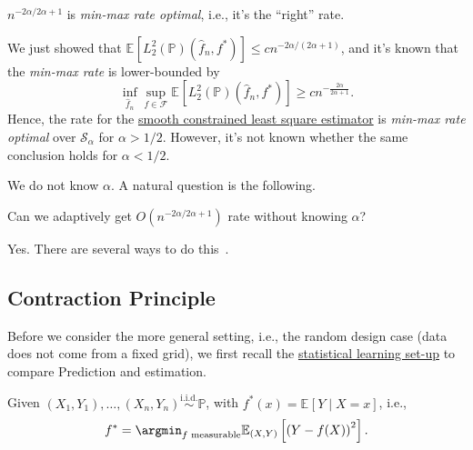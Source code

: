 \begin{remark}\label{rmk:min-max-rate-optimal}
	\(n^{-2\alpha / 2\alpha +1}\) is \emph{min-max rate optimal}, i.e., it's the ``right'' rate.
\end{remark}
\begin{explanation}
	We just showed that \(\mathbb{E}_{}[ L_2^2 (\mathbb{P} ) ( \hat{f} _n, f^{\ast} )] \leq c n^{-2\alpha / (2\alpha + 1)}\), and it's known that the \emph{min-max rate} is lower-bounded by
	\[
		\inf _{\hat{f} _n} \sup _{f \in \mathscr{F} } \mathbb{E}_{}\left[ L_2^2(\mathbb{P} ) (\hat{f} _n, f^{\ast} )\right] \geq c n^{-\frac{2\alpha}{2\alpha + 1}}.
	\]
	Hence, the rate for the \hyperref[prb:smooth-LS]{smooth constrained least square estimator} is \emph{min-max rate optimal} over \(\mathcal{S} _\alpha \) for \(\alpha > 1 / 2\). However, it's not known whether the same conclusion holds for \(\alpha < 1 / 2\).
\end{explanation}

We do not know \(\alpha \). A natural question is the following.

\begin{problem*}
	Can we adaptively get \(O(n^{-2\alpha / 2\alpha + 1})\) rate without knowing \(\alpha \)?
\end{problem*}
\begin{answer}
	Yes. There are several ways to do this~\cite{tsybakov2008introduction}.
\end{answer}

\subsection{Contraction Principle}
Before we consider the more general setting, i.e., the random design case (data does not come from a fixed grid), we first recall the \hyperref[sec:statistical-learning]{statistical learning set-up} to compare Prediction and estimation.

\begin{prev}
	Given \((X_1, Y_1), \dots , (X_n, Y_n) \overset{\text{i.i.d.} }{\sim } \mathbb{P} \), with \(f^{\ast} (x) = \mathbb{E}_{}\left[Y \mid X = x \right] \), i.e.,
	\[
		f^{\ast} = \argmin_{f \text{ measurable} } \mathbb{E}_{(X, Y)}\left[ \left( Y - f(X)  \right) ^2 \right] .
	\]
\end{prev}

